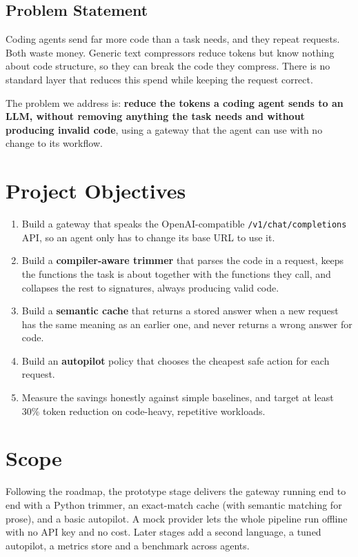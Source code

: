 \documentclass[12pt, a4paper, oneside]{report}
\newcommand{\code}[1]{\texttt{#1}}
\begin{document}
\subsection{Problem Statement}

Coding agents send far more code than a task needs, and they repeat requests. Both
waste money. Generic text compressors reduce tokens but know nothing about code
structure, so they can break the code they compress. There is no standard layer
that reduces this spend while keeping the request correct.

The problem we address is: \textbf{reduce the tokens a coding agent sends to an
LLM, without removing anything the task needs and without producing invalid
code}, using a gateway that the agent can use with no change to its workflow.

\section{Project Objectives}

\begin{enumerate}
    \item Build a gateway that speaks the OpenAI-compatible
          \code{/v1/chat/completions} API, so an agent only has to change its base
          URL to use it.
    \item Build a \textbf{compiler-aware trimmer} that parses the code in a request,
          keeps the functions the task is about together with the functions they
          call, and collapses the rest to signatures, always producing valid code.
    \item Build a \textbf{semantic cache} that returns a stored answer when a new
          request has the same meaning as an earlier one, and never returns a wrong
          answer for code.
    \item Build an \textbf{autopilot} policy that chooses the cheapest safe action
          for each request.
    \item Measure the savings honestly against simple baselines, and target at
          least 30\% token reduction on code-heavy, repetitive workloads.
\end{enumerate}

\section{Scope}

Following the roadmap, the prototype stage delivers the gateway running end to end
with a Python trimmer, an exact-match cache (with semantic matching for prose), and
a basic autopilot. A mock provider lets the whole pipeline run offline with no API
key and no cost. Later stages add a second language, a tuned autopilot, a metrics
store and a benchmark across agents.
\end{document}
